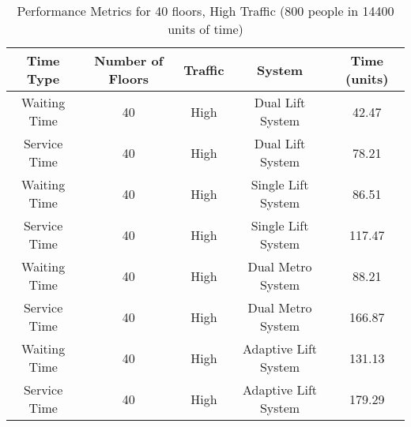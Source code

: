 \documentclass[12pt,a4paper]{report}
\begin{document}
\begin{table}[H]
\centering
\begin{tabular}{|c|c|c|c|c|}
\hline
\textbf{Time Type}    & \textbf{Number of Floors} & \textbf{Traffic} & \textbf{System}     & \textbf{Time (units)} \\ \hline
Waiting Time         & 40                    & High              & Dual Lift System               & 42.47            \\ \hline
Service Time         & 40                    & High              & Dual Lift System               & 78.21              \\ \hline
Waiting Time         & 40                    & High              & Single Lift System           & 86.51              \\ \hline
Service Time         & 40                    & High              & Single Lift System & 117.47              \\ \hline
Waiting Time         & 40                    & High              & Dual Metro System  & 88.21              \\ \hline
Service Time         & 40                    & High              & Dual Metro System  & 166.87              \\ \hline
Waiting Time         & 40                     & High         & Adaptive Lift System           & 131.13            \\ \hline
Service Time         & 40                     & High         & Adaptive Lift System           & 179.29            \\ \hline
\end{tabular}
\caption{Performance Metrics for 40 floors, High Traffic (800 people in 14400 units of time)}
\end{table}
\end{document}
